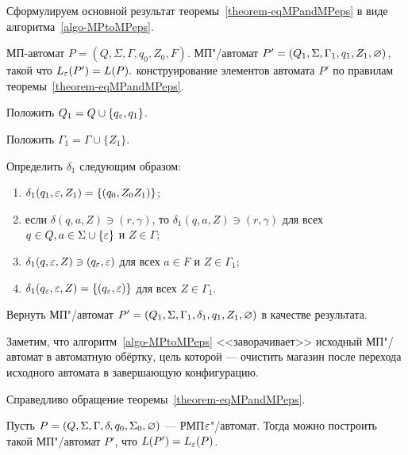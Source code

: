 Сформулируем основной результат теоремы~\ref{theorem-eqMPandMPeps} в виде алгоритма~\ref{algo-MPtoMPeps}.

{\label{algo-MPtoMPeps} МП-автомат $P = (Q, \Sigma, \Gamma, q_0, Z_0, F)$. }
{МП"/автомат $P' = (Q_1, \Sigma, \Gamma_1, q_1, Z_1, \varnothing)$, такой что $L_\varepsilon(P') = L(P).$}
{ конструирование элементов автомата $P'$ по правилам теоремы~\ref{theorem-eqMPandMPeps}.}
{
\item Положить $Q_1 = Q \cup \{ q_\varepsilon, q_1 \}$.

\item Положить $\Gamma_1 = \Gamma \cup \{Z_1\}$.

\item Определить $\delta_1$ следующим образом:
	\begin{enumerate}[itemindent=\parindent,leftmargin=!]
		\item $\delta_1(q_1, \varepsilon, Z_1) = \{ (q_0, Z_0Z_1) \}$;
		\item если $\delta(q, a, Z) \ni (r, \gamma)$, то $\delta_1(q, a, Z) \ni (r, \gamma)$ для всех $q \in Q, a \in \Sigma \cup \{ \varepsilon \}$ и $Z \in \Gamma$;
		\item $\delta_1(q, \varepsilon, Z) \ni (q_\varepsilon, \varepsilon)$ для всех $a \in F$ и $Z \in \Gamma_1$;
		\item $\delta_1(q_\varepsilon, \varepsilon, Z) = \{ (q_\varepsilon, \varepsilon) \}$ для всех $Z \in \Gamma_1$.
  \end{enumerate}  

\item Вернуть МП"/автомат $P' = (Q_1, \Sigma, \Gamma_1, \delta_1, q_1, Z_1, \varnothing)$ в качестве результата.
} 

Заметим, что алгоритм~\ref{algo-MPtoMPeps} <<заворачивает>> исходный МП"/автомат в автоматную обёртку, цель которой --- очистить магазин после перехода исходного автомата в завершающую конфигурацию. 

Справедливо обращение теоремы~\ref{theorem-eqMPandMPeps}.

\begin{mytheorem}
\label{theorem-eqRMPandMPeps}
Пусть $P=(Q,\Sigma,\Gamma,\delta,q_0,\Sigma_0,\varnothing)$ --- РМП$\varepsilon$"/автомат. Тогда можно построить такой МП"/автомат $P'$, что $L(P')=L_\varepsilon(P)$.
\end{mytheorem}

